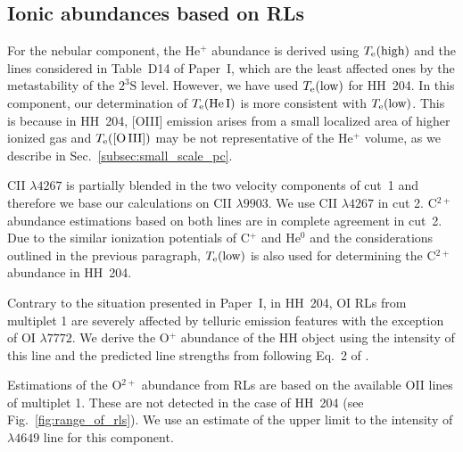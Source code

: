 \documentclass[twocolumn]{aastex63}
\newcommand{\eduardo}[1]{{\color{teal}E: #1}}
\newcommand{\jorge}[1]{{\color{magenta}J: #1}}
\begin{document}
\subsection{Ionic abundances based on RLs}
\label{subsec:ionic_abundances_rls}

For the nebular component,  the He$^{+}$ abundance is derived using $T_{\rm e} (\text{high})$ and the lines considered in Table~D14 of Paper~I, which are the least affected ones by the metastability of the $2^3\text{S}$ level. However, we have used $T_{\rm e} (\text{low})$ for HH~204. In this component, our determination of $T_{\rm e}(\text{He\thinspace I})$ is more consistent with $T_{\rm e} (\text{low})$. This is because in HH~204, [O\thinspace III] emission arises from a small localized area of higher ionized gas and $T_{\rm e} (\text{[O\thinspace III]})$ may be not representative of the He$^{+}$ volume, as we describe in Sec.~\ref{subsec:small_scale_pc}. 

C\thinspace II $\lambda 4267$ is partially blended in the two velocity components of cut~1 and therefore we base our calculations on C\thinspace II $\lambda 9903$. We use C\thinspace II $\lambda 4267$ in cut 2. C$^{2+}$ abundance estimations based on both lines are in complete agreement in cut~2. Due to the similar ionization potentials of C$^{+}$ and He$^{0}$ and the considerations outlined in the previous paragraph, $T_{\rm e}(\text{low})$ is also used for determining the C$^{2+}$ abundance in HH~204.  

Contrary to the situation presented in Paper~I, in HH~204,  O\thinspace I RLs from multiplet 1 are severely affected by telluric emission features with the exception of O\thinspace I $\lambda 7772$. We derive the O$^{+}$ abundance of the HH object using the intensity of this line and the predicted line strengths from \citet{Wiese96} following Eq.~2 of \citet{Esteban98}.

Estimations of the O$^{2+}$ abundance from RLs are based on the available  O\thinspace II lines of multiplet 1. These are not detected in the case of HH~204 (see Fig.~\ref{fig:range_of_rls}). We use an estimate of the upper limit to the intensity of $\lambda 4649$ line for this component.
\end{document}
